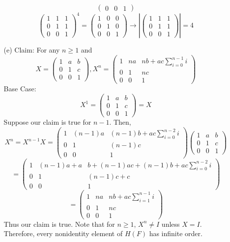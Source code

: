 \documentclass[12pt]{article}
\begin{document}
\begin{itemize}
\begin{itemize}
$$\begin{pmatrix}
0 & 0 & 1
\end{pmatrix}$$
$$\begin{pmatrix}
1 & 1 & 1 \\
0 & 1 & 1 \\
0 & 0 & 1
\end{pmatrix}^4 = \begin{pmatrix}
1 & 0 & 0 \\
0 & 1 & 0 \\
0 & 0 & 1
\end{pmatrix} \rightarrow \left| \begin{pmatrix}
1 & 1 & 1 \\
0 & 1 & 1 \\
0 & 0 & 1
\end{pmatrix} \right| = 4$$
\item[(e)]
Claim: For any $n \geq 1$ and
$$X = \begin{pmatrix}
1 & a & b \\
0 & 1 & c \\
0 & 0 & 1
\end{pmatrix}, X^n = \begin{pmatrix}
1 & na & nb + ac\sum_{i = 0}^{n - 1} i \\
0 & 1 & nc \\
0 & 0 & 1
\end{pmatrix}$$
Base Case:
$$X^1 = \begin{pmatrix}
1 & a & b \\
0 & 1 & c \\
0 & 0 & 1
\end{pmatrix} = X$$
Suppose our claim is true for $n - 1$. Then,
$$X^{n} = X^{n-1}X = \begin{pmatrix}
1 & (n - 1)a & (n - 1)b + ac\sum_{i = 0}^{n - 2} i \\
0 & 1 & (n - 1)c \\
0 & 0 & 1
\end{pmatrix}\begin{pmatrix}
1 & a & b \\
0 & 1 & c \\
0 & 0 & 1
\end{pmatrix}$$
$$= \begin{pmatrix}
1 & (n-1)a + a & b + (n - 1)ac + (n - 1)b + ac\sum_{i = 0}^{n - 2} i \\
0 & 1 & (n - 1)c + c \\
0 & 0 & 1
\end{pmatrix}$$
$$= \begin{pmatrix}
1 & na & nb + ac\sum_{i=1}^{n-1}i \\
0 & 1 & nc \\
0 & 0 & 1
\end{pmatrix}$$
Thus our claim is true. Note that for $n \geq 1$, $X^n \neq I$ unless $X = I$. Therefore, every nonidentity element of $H(F)$ has infinite order.
\end{itemize}
\end{itemize}
\end{document}
